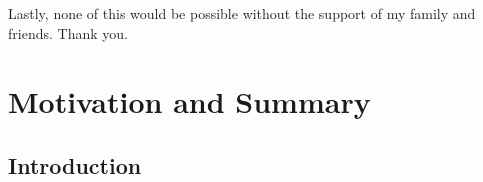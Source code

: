 \documentclass{dcthesis}
\numberwithin{equation}{section}
\numberwithin{equation}{section}
\theoremstyle{definition}
\begin{document}
Lastly, none of this would be possible without the support of my family and friends. Thank you.





\tableofcontents



\mainmatter


\chapter{Motivation and Summary}  

\section{Introduction} %
\end{document}
